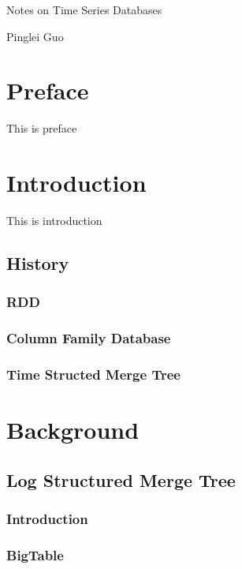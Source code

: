 \documentclass[12pt,a4paper,oneside]{book}
\author{Pinglei Guo}
\date{\today}
\begin{document}
\centerline{\Large{Notes on Time Series Databases}}
\centerline{Pinglei Guo}
\clearpage

\chapter*{Preface}

This is preface

\tableofcontents
\clearpage

\chapter{Introduction}

This is introduction

\section{History}

\subsection{RDD}

\subsection{Column Family Database}

\subsection{Time Structed Merge Tree}

\chapter{Background}

\section{Log Structured Merge Tree}

\subsection{Introduction}

\subsection{BigTable}
\end{document}
